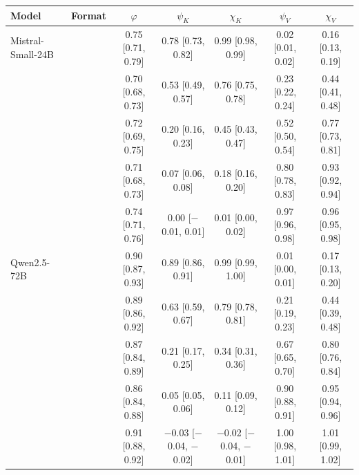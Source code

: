 \begin{tabular}{llccccc}
\toprule
Model & Format & $\varphi$ & $\psi_K$ & $\chi_K$ & $\psi_V$ & $\chi_V$ \\
\midrule
Mistral-Small-24B & \fmtLetter{} & 0.75 [0.71, 0.79] & 0.78 [0.73, 0.82] & 0.99 [0.98, 0.99] & 0.02 [0.01, 0.02] & 0.16 [0.13, 0.19] \\
 & \fmtOpt{} & 0.70 [0.68, 0.73] & 0.53 [0.49, 0.57] & 0.76 [0.75, 0.78] & 0.23 [0.22, 0.24] & 0.44 [0.41, 0.48] \\
 & \fmtPost{} & 0.72 [0.69, 0.75] & 0.20 [0.16, 0.23] & 0.45 [0.43, 0.47] & 0.52 [0.50, 0.54] & 0.77 [0.73, 0.81] \\
 & \fmtNone{} & 0.71 [0.68, 0.73] & 0.07 [0.06, 0.08] & 0.18 [0.16, 0.20] & 0.80 [0.78, 0.83] & 0.93 [0.92, 0.94] \\
 & \fmtBefore{} & 0.74 [0.71, 0.76] & 0.00 [$-$0.01, 0.01] & 0.01 [0.00, 0.02] & 0.97 [0.96, 0.98] & 0.96 [0.95, 0.98] \\
\midrule
Qwen2.5-72B & \fmtLetter{} & 0.90 [0.87, 0.93] & 0.89 [0.86, 0.91] & 0.99 [0.99, 1.00] & 0.01 [0.00, 0.01] & 0.17 [0.13, 0.20] \\
 & \fmtOpt{} & 0.89 [0.86, 0.92] & 0.63 [0.59, 0.67] & 0.79 [0.78, 0.81] & 0.21 [0.19, 0.23] & 0.44 [0.39, 0.48] \\
 & \fmtPost{} & 0.87 [0.84, 0.89] & 0.21 [0.17, 0.25] & 0.34 [0.31, 0.36] & 0.67 [0.65, 0.70] & 0.80 [0.76, 0.84] \\
 & \fmtNone{} & 0.86 [0.84, 0.88] & 0.05 [0.05, 0.06] & 0.11 [0.09, 0.12] & 0.90 [0.88, 0.91] & 0.95 [0.94, 0.96] \\
 & \fmtBefore{} & 0.91 [0.88, 0.92] & $-$0.03 [$-$0.04, $-$0.02] & $-$0.02 [$-$0.04, $-$0.01] & 1.00 [0.98, 1.01] & 1.01 [0.99, 1.02] \\
\bottomrule
\end{tabular}
